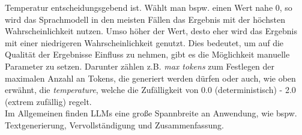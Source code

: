 Temperatur entscheidungsgebend ist. Wählt man bspw. einen Wert nahe 0, so wird das Sprachmodell in den meisten Fällen das Ergebnis mit der höchsten Wahrscheinlichkeit nutzen. Umso höher der Wert, desto eher wird das Ergebnis mit einer niedrigeren Wahrscheinlichkeit genutzt. \cite*{WeightsBiases} Dies bedeutet, um auf die Qualität der Ergebnisse Einfluss zu nehmen, gibt es die Möglichkeit manuelle Parameter zu setzen. Darunter zählen z.B. \textit{max tokens} zum Festlegen der maximalen Anzahl an Tokens, die generiert werden dürfen oder auch, wie oben erwähnt, die \textit{temperature}, welche die Zufälligkeit von 0.0 (deterministisch) - 2.0 (extrem zufällig) regelt.\\ Im Allgemeinen finden LLMs eine große Spannbreite an Anwendung, wie bspw. Textgenerierung, Vervollständigung und Zusammenfassung. \cite*{dhadukHowLargeLanguage2023}

